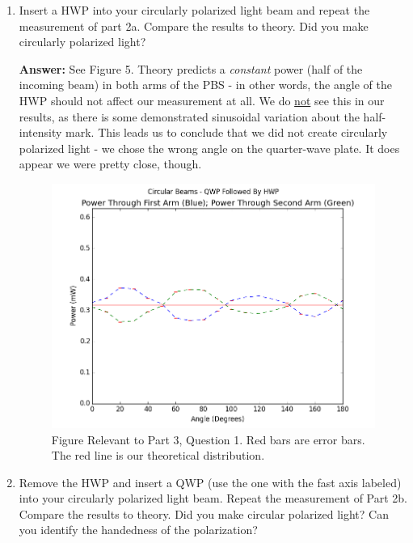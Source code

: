 \documentclass[10pt,a4paper]{article}
\begin{document}
\begin{enumerate}
\item Insert a HWP into your circularly polarized light beam and repeat the measurement of part 2a. Compare the results to theory. Did you make circularly polarized light?

\textbf{Answer: } See Figure 5. Theory predicts a \textsl{constant} power (half of the incoming beam) in both arms of the PBS - in other words, the angle of the HWP should not affect our measurement at all. We do \ul{not} see this in our results, as there is some demonstrated   sinusoidal variation about the half-intensity mark. This leads us to conclude that we did not create circularly polarized light - we chose the wrong angle on the quarter-wave plate. It does appear we were pretty close, though.
\begin{figure}[h]
\centering
\includegraphics[scale = 0.6]{../Analysis/figure_6.png}
\caption{Figure Relevant to Part 3, Question 1. Red bars are error bars. The red line is our theoretical distribution.} 
\end{figure}
\item Remove the HWP and insert a QWP (use the one with the fast axis labeled) into your circularly polarized light beam. Repeat the measurement of Part 2b. Compare the results to theory. Did you make circular polarized light? Can you identify the handedness of the polarization?


\end{enumerate}
\end{document}
